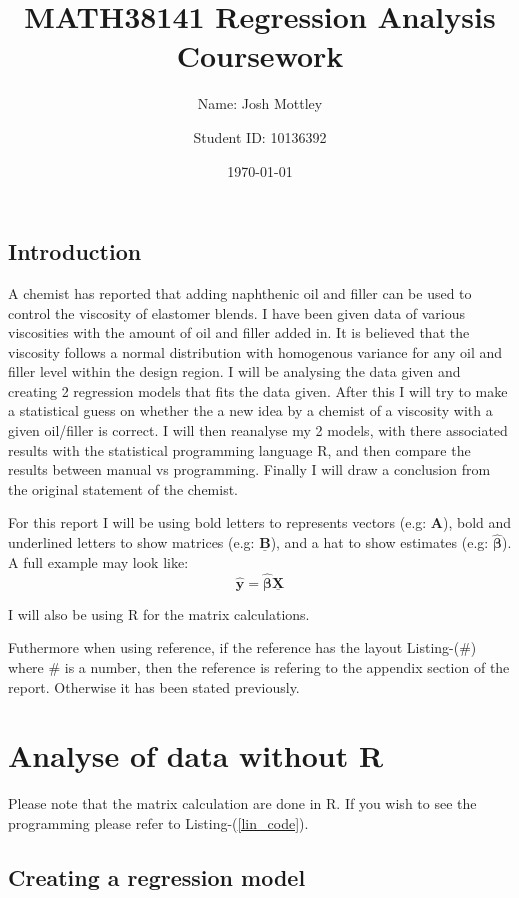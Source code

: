 \documentclass[12pt]{article}
\title{MATH38141 Regression Analysis Coursework}
\author{Name: Josh Mottley
\and Student ID: 10136392}
\date{\today}
\newcommand{\vect}[1]{\boldsymbol{#1}}
\newcommand{\mat}[1]{\underline{\boldsymbol{#1}}}
\newcommand{\est}[1]{\hat{#1}}
\begin{document}
\begin{titlepage}
\maketitle

\section*{Introduction}
A chemist has reported that adding naphthenic oil and filler can be used to control the viscosity of elastomer blends. I have been given data of various viscosities with the amount of oil and filler added in. It is believed that the viscosity follows a normal distribution with homogenous variance for any oil and filler level within the design region. I will be analysing the data given and creating 2 regression models that fits the data given. After this I will try to make a statistical guess on whether the a new idea by a chemist of a viscosity with a given oil/filler is correct.
I will then reanalyse my 2 models, with there associated results with the statistical programming language R, and then compare the results between manual vs programming. Finally I will draw a conclusion from the original statement of the chemist. \par

For this report I will be using bold letters to represents vectors (e.g: $\vect{A}$), bold and underlined letters to show matrices (e.g: $\mat{B}$), and a hat to show estimates (e.g: $\est{\vect{\beta}}$). A full example may look like:
\begin{equation*}
\est{\vect{y}}=\est{\vect{\beta}}\mat{X}
\end{equation*} \par
I will also be using R for the matrix calculations.

Futhermore when using reference, if the reference has the layout Listing-(\#) where \# is a number, then the reference is refering to the appendix section of the report. Otherwise it has been stated previously.
\vfill
\end{titlepage}

\section{Analyse of data without R}
Please note that the matrix calculation are done in R. If you wish to see the programming please refer to Listing-(\ref{lin_code}).
\subsection{Creating a regression model}
\end{document}
